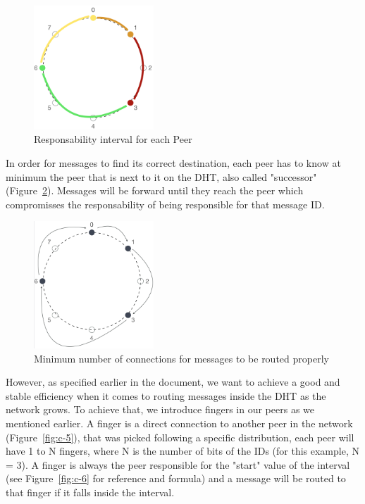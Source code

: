 \begin{figure}[h!]
  \centering
  \includegraphics[width=0.4\textwidth]{figs/chord-3}
  \caption{Responsability interval for each Peer}
  \label{fig:c-3}
\end{figure}

In order for messages to find its correct destination, each peer has to know at minimum the peer that is next to it on the DHT, also called "successor" (Figure~\ref{fig:c-4}). Messages will be forward until they reach the peer which compromisses the responsability of being responsible for that message ID.

\begin{figure}[h!]
  \centering
  \includegraphics[width=0.4\textwidth]{figs/chord-4}
  \caption{Minimum number of connections for messages to be routed properly}
  \label{fig:c-4}
\end{figure}

However, as specified earlier in the document, we want to achieve a good and stable efficiency when it comes to routing messages inside the DHT as the network grows. To achieve that, we introduce fingers in our peers as we mentioned earlier. A finger is a direct connection to another peer in the network (Figure~\ref{fig:c-5}), that was picked following a specific distribution, each peer will have 1 to N fingers, where N is the number of bits of the IDs (for this example, N = 3). A finger is always the peer responsible for the "start" value of the interval (see Figure~\ref{fig:c-6} for reference and formula) and a message will be routed to that finger if it falls inside the interval.

